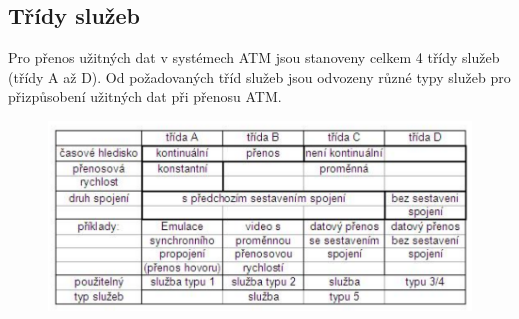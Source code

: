 \subsection{Třídy služeb}
Pro přenos užitných dat v systémech ATM jsou stanoveny celkem 4 třídy služeb (třídy A až D). Od požadovaných tříd služeb jsou odvozeny různé typy služeb pro přizpůsobení užitných dat při přenosu ATM.

\begin{figure}[h]
    \centering
    \includegraphics[scale=0.6]{snimky/sluzby.png}
\end{figure}
\newpage


